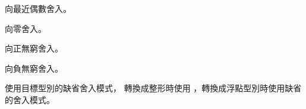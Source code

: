 \startCLOD[修飾符][舍入模式描述]

{向最近偶數舍入。}

{向零舍入。}

{向正無窮舍入。}

{向負無窮舍入。}

{使用目標型別的缺省舍入模式，
轉換成整形時使用 ，轉換成浮點型別時使用缺省的舍入模式。}

\stopCLOD

